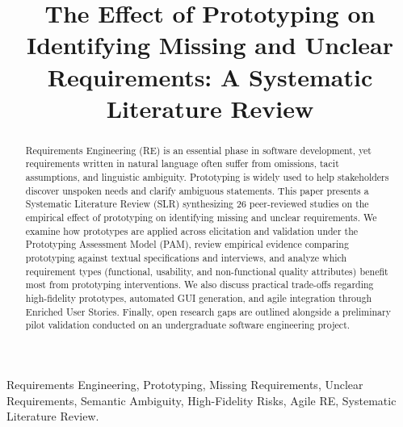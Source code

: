 \documentclass[conference]{IEEEtran}
\begin{document}
\title{The Effect of Prototyping on Identifying Missing and Unclear Requirements: A Systematic Literature Review}

\author{
}

\maketitle

\begin{abstract}
Requirements Engineering (RE) is an essential phase in software development, yet requirements written in natural language often suffer from omissions, tacit assumptions, and linguistic ambiguity. Prototyping is widely used to help stakeholders discover unspoken needs and clarify ambiguous statements. This paper presents a Systematic Literature Review (SLR) synthesizing 26 peer-reviewed studies on the empirical effect of prototyping on identifying missing and unclear requirements. We examine how prototypes are applied across elicitation and validation under the Prototyping Assessment Model (PAM), review empirical evidence comparing prototyping against textual specifications and interviews, and analyze which requirement types (functional, usability, and non-functional quality attributes) benefit most from prototyping interventions. We also discuss practical trade-offs regarding high-fidelity prototypes, automated GUI generation, and agile integration through Enriched User Stories. Finally, open research gaps are outlined alongside a preliminary pilot validation conducted on an undergraduate software engineering project.
\end{abstract}

\begin{IEEEkeywords}
Requirements Engineering, Prototyping, Missing Requirements, Unclear Requirements, Semantic Ambiguity, High-Fidelity Risks, Agile RE, Systematic Literature Review.
\end{IEEEkeywords}









{\footnotesize


}
\end{document}
